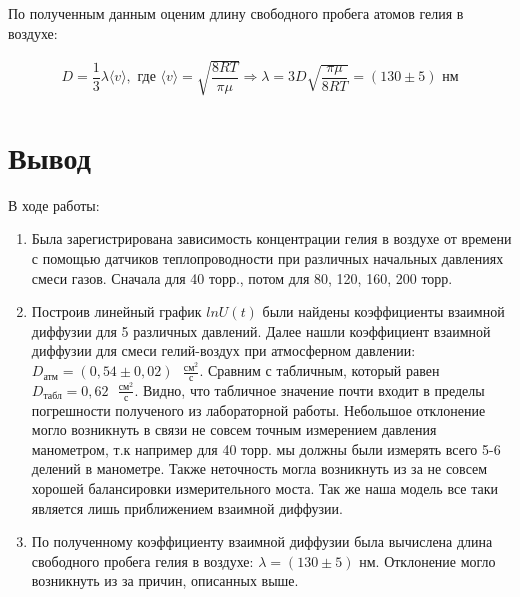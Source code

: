 \documentclass[a4paper,12pt]{article}
\begin{document}
	По полученным данным оценим длину свободного пробега атомов гелия в воздухе:
	
	\begin{align}
		D=\dfrac{1}{3}\lambda\langle v\rangle,\text{ где } \langle v \rangle = \sqrt{\dfrac{8RT}{\pi \mu}} \Rightarrow \lambda = 3D\sqrt{\dfrac{\pi \mu}{8RT}} = (130\pm 5)\text{ нм}
	\end{align}
	
	\section{Вывод}
	
	В ходе работы:
	
	\begin{enumerate}
		\item Была зарегистрирована зависимость концентрации гелия в воздухе от времени с помощью датчиков теплопроводности при различных начальных давлениях смеси газов. Сначала для 40 торр., потом для 80, 120, 160, 200 торр.
		\item Построив линейный график $lnU (t)$ были найдены коэффициенты взаимной диффузии для 5 различных давлений. Далее нашли коэффициент взаимной диффузии для смеси гелий-воздух при атмосферном давлении: $D_\text{атм} = (0,54\pm0,02)\text{ } \frac{\text{см}^2}{\text{с}}$. Сравним с табличным, который равен $D_\text{табл} = 0,62\text{ } \frac{\text{см}^2}{\text{с}}$. Видно, что табличное значение почти входит в пределы погрешности полученого из лабораторной работы. Небольшое отклонение могло возникнуть в связи не совсем точным измерением давления манометром, т.к например для 40 торр. мы должны были измерять всего 5-6 делений в манометре. Также неточность могла возникнуть из за не совсем хорошей балансировки измерительного моста. Так же наша модель все таки является лишь приближением взаимной диффузии. 
		\item По полученному коэффициенту взаимной диффузии была вычислена длина свободного пробега гелия в воздухе: $\lambda = (130\pm 5)\text{ нм}$. Отклонение могло возникнуть из за причин, описанных выше.
	\end{enumerate}
\end{document}
